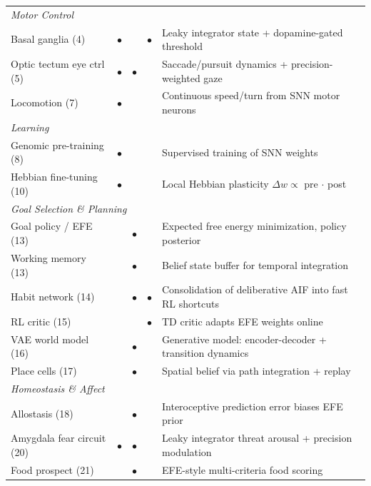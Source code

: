 \documentclass[11pt,a4paper]{article}
\begin{document}
\begin{table}[H]
\begin{tabular}{lcccp{5.8cm}}
\midrule
\multicolumn{5}{l}{\textit{Motor Control}} \\
Basal ganglia (4)              & $\bullet$ &           & $\bullet$ & Leaky integrator state + dopamine-gated threshold \\
Optic tectum eye ctrl (5)      & $\bullet$ & $\bullet$ &           & Saccade/pursuit dynamics + precision-weighted gaze \\
Locomotion (7)                 & $\bullet$ &           &           & Continuous speed/turn from SNN motor neurons \\
\midrule
\multicolumn{5}{l}{\textit{Learning}} \\
Genomic pre-training (8)       & $\bullet$ &           &           & Supervised training of SNN weights \\
Hebbian fine-tuning (10)       & $\bullet$ &           &           & Local Hebbian plasticity $\Delta w \propto$ pre $\cdot$ post \\
\midrule
\multicolumn{5}{l}{\textit{Goal Selection \& Planning}} \\
Goal policy / EFE (13)         &           & $\bullet$ &           & Expected free energy minimization, policy posterior \\
Working memory (13)            &           & $\bullet$ &           & Belief state buffer for temporal integration \\
Habit network (14)             &           & $\bullet$ & $\bullet$ & Consolidation of deliberative AIF into fast RL shortcuts \\
RL critic (15)                 &           &           & $\bullet$ & TD critic adapts EFE weights online \\
VAE world model (16)           &           & $\bullet$ &           & Generative model: encoder-decoder + transition dynamics \\
Place cells (17)               &           & $\bullet$ &           & Spatial belief via path integration + replay \\
\midrule
\multicolumn{5}{l}{\textit{Homeostasis \& Affect}} \\
Allostasis (18)                &           & $\bullet$ &           & Interoceptive prediction error biases EFE prior \\
Amygdala fear circuit (20)     & $\bullet$ & $\bullet$ &           & Leaky integrator threat arousal + precision modulation \\
Food prospect (21)             &           & $\bullet$ &           & EFE-style multi-criteria food scoring \\

\end{tabular}
\end{table}
\end{document}
